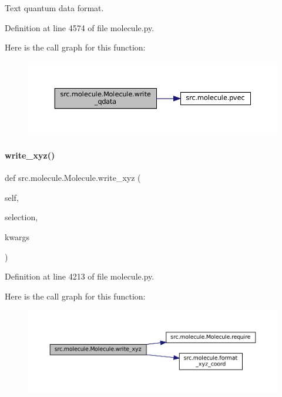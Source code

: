 Text quantum data format. 



Definition at line 4574 of file molecule.\+py.

Here is the call graph for this function\+:
\nopagebreak
\begin{figure}[H]
\begin{center}
\leavevmode
\includegraphics[width=350pt]{classsrc_1_1molecule_1_1Molecule_ac33547444f6fc81cae37ce37db9743ef_cgraph}
\end{center}
\end{figure}
\mbox{\label{classsrc_1_1molecule_1_1Molecule_af42c16177cc7cbfce3c0b2be7b132480}} 
\paragraph{\texorpdfstring{write\+\_\+xyz()}{write\_xyz()}}
{\footnotesize\ttfamily def src.\+molecule.\+Molecule.\+write\+\_\+xyz (\begin{DoxyParamCaption}\item[{}]{self,  }\item[{}]{selection,  }\item[{}]{kwargs }\end{DoxyParamCaption})}



Definition at line 4213 of file molecule.\+py.

Here is the call graph for this function\+:
\nopagebreak
\begin{figure}[H]
\begin{center}
\leavevmode
\includegraphics[width=350pt]{classsrc_1_1molecule_1_1Molecule_af42c16177cc7cbfce3c0b2be7b132480_cgraph}
\end{center}
\end{figure}


